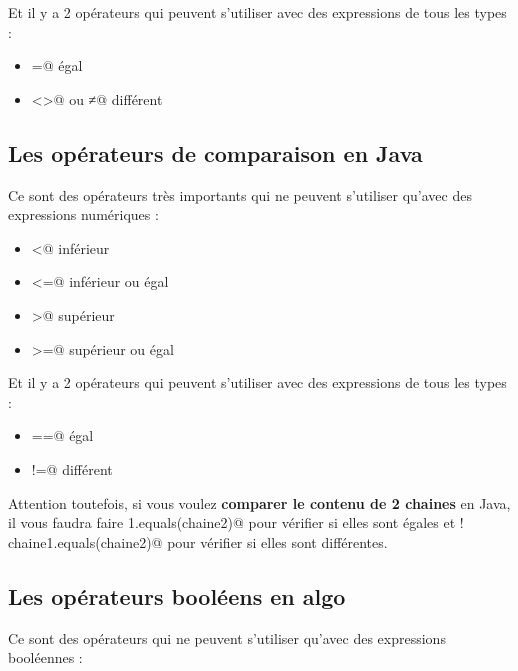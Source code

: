 \documentclass[11pt,a4paper]{article}
\begin{document}
          Et il y a 2 op\'erateurs qui peuvent s'utiliser avec des expressions de tous les types :
          
					\begin{itemize}
				
			\item \verb@=@ \'egal 
			\item \verb@<>@ ou \verb@≠@ diff\'erent 
					\end{itemize}
				
            \par
        \subsection{Les op\'erateurs de comparaison en Java}
          Ce sont des op\'erateurs tr\`es importants qui ne peuvent s'utiliser qu'avec des expressions num\'eriques :
          
					\begin{itemize}
				
			\item \verb@<@ inf\'erieur 
			\item \verb@<=@ inf\'erieur ou \'egal 
			\item \verb@>@ sup\'erieur 
			\item \verb@>=@ sup\'erieur ou \'egal 
					\end{itemize}
				
          Et il y a 2 op\'erateurs qui peuvent s'utiliser avec des expressions de tous les types :
          
					\begin{itemize}
				
			\item \verb@==@ \'egal 
			\item \verb@!=@ diff\'erent 
					\end{itemize}
				
            \par
        
          Attention toutefois, si vous voulez \textbf{comparer le contenu de 2 chaines} en Java,
          il vous faudra faire \verb@chaine1.equals(chaine2)@
          pour v\'erifier si elles sont \'egales et \verb@! chaine1.equals(chaine2)@
          pour v\'erifier si elles sont diff\'erentes.
        
            \par
        \subsection{Les op\'erateurs bool\'eens en algo}
          Ce sont des op\'erateurs qui ne peuvent s'utiliser qu'avec des expressions bool\'eennes :
          
\end{document}
